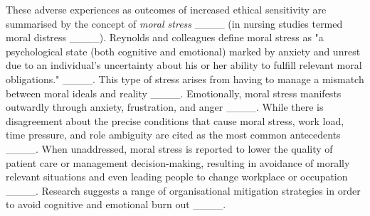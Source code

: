 These adverse experiences as outcomes of increased ethical sensitivity are summarised by the concept of \textit{moral stress} ____ (in nursing studies termed moral distress ____). Reynolds and colleagues define moral stress as "a psychological state (both cognitive and emotional) marked by anxiety and unrest due to an individual’s uncertainty about his or her ability to fulﬁll relevant moral obligations." ____.
This type of stress arises from having to manage a mismatch between moral ideals and reality ____. Emotionally, moral stress manifests outwardly through anxiety, frustration, and anger ____.
While there is disagreement about the precise conditions that cause moral stress, work load, time pressure, and role ambiguity are cited as the most common antecedents ____. When unaddressed, moral stress is reported to lower the quality of patient care or management decision-making, resulting in avoidance of morally relevant situations and even leading people to change workplace or occupation ____. Research suggests a range of organisational mitigation strategies in order to avoid cognitive and emotional burn out ____.

